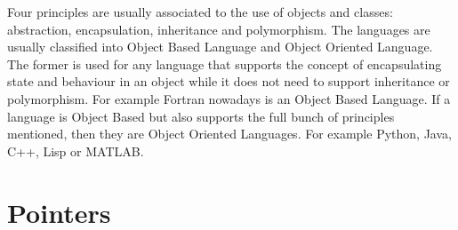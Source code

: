 Four principles are usually associated to the use of objects and classes: 
abstraction, encapsulation, inheritance and polymorphism. 
The languages are usually classified into Object Based Language and Object Oriented Language.
The former is used for any language that supports the concept of encapsulating state and behaviour 
in an object while it does not need to support inheritance or polymorphism. 
For example Fortran nowadays is an Object Based Language.
If a language is Object Based but also supports the full bunch of principles mentioned, then they are Object Oriented Languages. 
For example Python, Java, C++, Lisp or MATLAB.








\newpage 
    \section{Pointers} 

